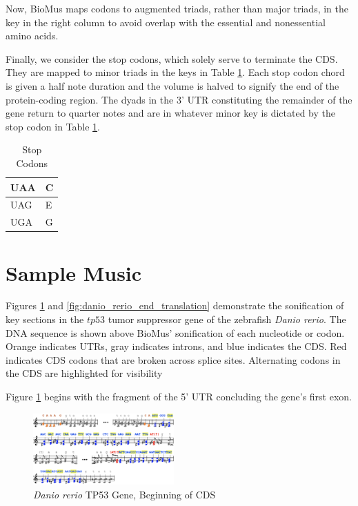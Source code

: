 \documentclass[letterpaper]{article}
\begin{document}
Now, BioMus maps codons to augmented triads, rather than major triads, in the key in the right column to avoid overlap with the essential and nonessential amino acids.


Finally, we consider the stop codons, which solely serve to terminate the CDS. They are mapped to minor triads in the keys in Table  \ref{table:stop_codons}. Each stop codon chord is given a half note duration and the volume is halved to signify the end of the protein-coding region. The dyads in the 3’ UTR constituting the remainder of the gene return to quarter notes and are in whatever minor key is dictated by the stop codon in Table  \ref{table:stop_codons}.

\begin{table}[h!]
\centering
\vspace{-3mm}
\begin{tabular}{|l|l|}
\hline
UAA & C \\ \hline
UAG & E \\ \hline
UGA & G \\ \hline
\end{tabular}
\caption{Stop Codons}
\label{table:stop_codons}
\vspace{-6mm}
\end{table}

\section{Sample Music}

Figures \ref{fig:danio_rerio_start_translation} and \ref{fig:danio_rerio_end_translation} demonstrate the sonification of key sections in the $tp53$ tumor suppressor gene of the zebrafish \textit{Danio rerio}. The DNA sequence is shown above BioMus’ sonification of each nucleotide or codon. Orange indicates UTRs, gray indicates introns, and blue indicates the CDS. Red indicates CDS codons that are broken across splice sites. Alternating codons in the CDS are highlighted for visibility

Figure \ref{fig:danio_rerio_start_translation} begins with the fragment of the 5' UTR concluding the gene's first exon. 

\begin{figure}[h!]
\centering
\includegraphics[width=0.48\textwidth]{images/danio_rerio_start_translation}
\vspace{-3mm}
  \caption{\textit{Danio rerio} TP53 Gene, Beginning of CDS}
  \label{fig:danio_rerio_start_translation}
  \vspace{-3mm}
\end{figure}
\end{document}
